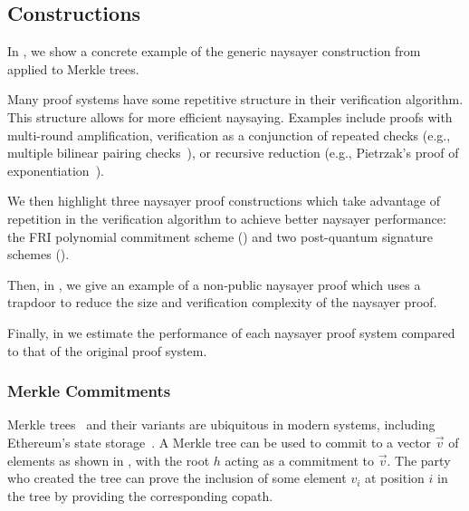 \subsection{Constructions}\label{sec:naysayer_apps}

In , we show a concrete example of the generic naysayer construction from  applied to Merkle trees. 

 Many proof systems have some repetitive structure in their verification algorithm. This structure allows for more efficient naysaying. Examples include proofs with multi-round amplification, verification as a conjunction of repeated checks (e.g., multiple bilinear pairing checks~\cite{EPRINT:GabWilCio19}), or recursive reduction (e.g., Pietrzak's proof of exponentiation~\cite{ITCS:Pietrzak19b}).

We then highlight three naysayer proof constructions which take advantage of repetition in the verification algorithm to achieve better naysayer performance: the FRI polynomial commitment scheme () and two post-quantum signature schemes (). 

Then, in , we give an example of a non-public naysayer proof which uses a trapdoor to reduce the size and verification complexity of the naysayer proof. %

Finally, in  we
estimate the performance of each naysayer proof system compared to that of the original proof system.

\subsubsection{Merkle Commitments}\label{sec:merkle_naysayer}


Merkle trees~\cite{C:Merkle87} and their variants are ubiquitous in modern systems, including Ethereum's state storage~\cite{ethereum_trie}. A Merkle tree can be used to commit to a vector $\vec{v}$ of elements as shown in , with the root $h$ acting as a commitment to $\vec{v}$. The party who created the tree can prove the inclusion of some element $v_i$ at position $i$ in the tree by providing the corresponding copath. 

